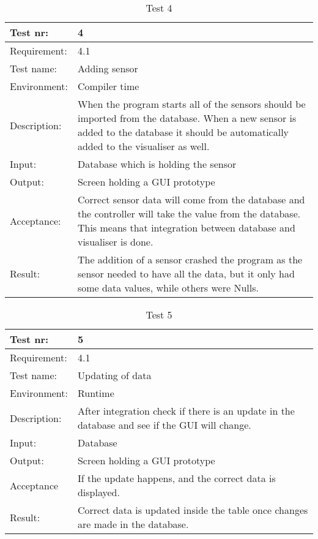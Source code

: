 \documentclass[../document.tex]{subfiles}
\begin{document}
\begin{table}[H]
\caption{Test 4}
\begin{tabularx}{\textwidth}{|l|X|}
\hline
Test nr:
&4
\\ \hline Requirement:
&4.1
\\ \hline Test name:
&Adding sensor
\\ \hline Environment:
&Compiler time
\\ \hline Description:
&When the program starts all of the sensors should be imported from the database. When a new sensor is added to the database it should be automatically added to the visualiser as well.
\\ \hline Input:
&Database which is holding the sensor
\\ \hline Output:
&Screen holding a GUI prototype
\\ \hline Acceptance:
&Correct sensor data will come from the database and the controller will take the value from the database. This means that integration between database and visualiser is done.
\\ \hline Result:
&The addition of a sensor crashed the program as the sensor needed to have all the data, but it only had some data values, while others were Nulls.
\\ \hline
\end{tabularx}
\end{table}

\begin{table}[H]
\caption{Test 5}
\begin{tabularx}{\textwidth}{|l|X|}
\hline
Test nr:
&5
\\ \hline Requirement:
&4.1
\\ \hline Test name:
&Updating of data
\\ \hline Environment:
&Runtime
\\ \hline Description:
&After integration check if there is an update in the database and see if the GUI will change.
\\ \hline Input:
&Database
\\ \hline Output:
&Screen holding a GUI prototype
\\ \hline Acceptance
&If the update happens, and the correct data is displayed.
\\ \hline Result:
&Correct data is updated inside the table once changes are made in the database.
\\ \hline
\end{tabularx}
\end{table}
\end{document}
